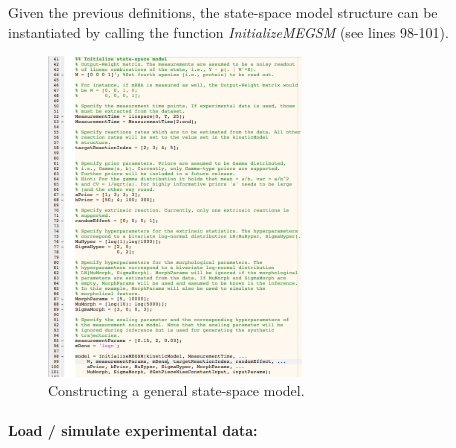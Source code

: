 \documentclass[a4paper, 9pt]{scrartcl}
\begin{document}
Given the previous definitions, the state-space model structure can be instantiated by calling the function \textit{InitializeMEGSM} (see lines 98-101).

\begin{figure}[htbp]
\begin{center}
	\includegraphics[width=0.6\textwidth]{figures/Doc_Statespace}
\caption{Constructing a general state-space model.}
\label{fig:Statespace}
\end{center}
\end{figure}

\paragraph{Load / simulate experimental data:}
\end{document}
